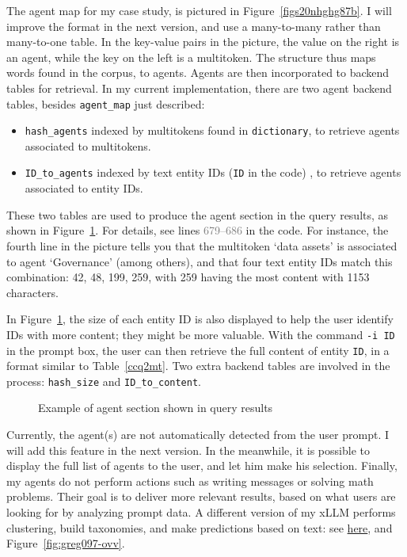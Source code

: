 \documentclass[10pt]{article}
\begin{document}
The agent map for my case study, is pictured in Figure~\ref{figs20nhghg87b}. I will improve the format in the next version, and
 use a many-to-many rather than many-to-one table. In the key-value pairs in the picture, the value on the right is an agent, while the key on the left is a multitoken. The structure thus maps words found in the corpus, to agents. Agents are then incorporated to backend tables for retrieval.
In my current implementation, there are two agent backend tables, besides \texttt{agent\_map} just described:
\vspace{1ex}
\begin{itemize}
\item \texttt{hash\_agents} indexed by multitokens found in \texttt{dictionary}, to retrieve agents associated to multitokens.
\item \texttt{ID\_to\_agents} indexed by text entity IDs (\texttt{ID} in the code) , to retrieve agents associated to entity IDs. 
\end{itemize}
\vspace{1ex}

\noindent These two tables are used to produce the agent section in the query results, as shown in Figure~\ref{ffloingg87b}.
 For details, see lines \textcolor{gray}{679--686} in the code. 
For instance, the fourth line in the picture tells you that the multitoken `data assets' is associated to agent `Governance' (among others), 
and that four text entity IDs match this combination: 42, 48, 199, 259, with 259 having the most content with 1153 characters.

In Figure~\ref{ffloingg87b}, the size of each entity ID is also displayed to help the user identify IDs with more content; they might be
more valuable. With the command \texttt{-i ID} in the prompt box, the user can then retrieve the full content of entity \texttt{ID}, in a format similar to
 Table~\ref{ccq2mt}. Two extra backend tables are involved in the process: \texttt{hash\_size} and \texttt{ID\_to\_content}.


\begin{figure}[H]
\centering
{}
\caption{Example of agent section shown in query results}
\label{ffloingg87b}
\end{figure}


Currently, the agent(s) are not automatically detected from the user prompt. I will add this feature in the next version. In the meanwhile, it is possible 
 to display the full list of agents to the user, and let him make his selection. Finally, my agents do not perform actions such as writing messages or solving math problems. Their goal is to deliver more relevant results, based on what users are looking for by analyzing prompt data. A different version of my xLLM performs 
\textcolor{index}{clustering}, build taxonomies, and 
make \textcolor{index}{predictions} based on text: see \href{https://mltblog.com/3y50Rt2}{here}, and Figure~\ref{fig:greg097-ovv}.   
\end{document}
